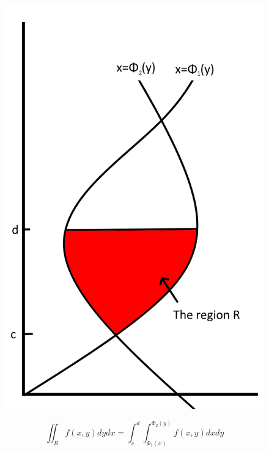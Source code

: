 \documentclass{article}
\begin{document}
\begin{figure}[h!]
    \centering
    \includegraphics[scale=.2]{rectRegion2.png}
    \caption{}
    \label{}
\end{figure}

\[\iint_R f(x,y)dydx=\int^d_c \int^{\Phi_{2}(y)}_{\Phi_1 (x)} f(x,y)dxdy\]
\end{document}
